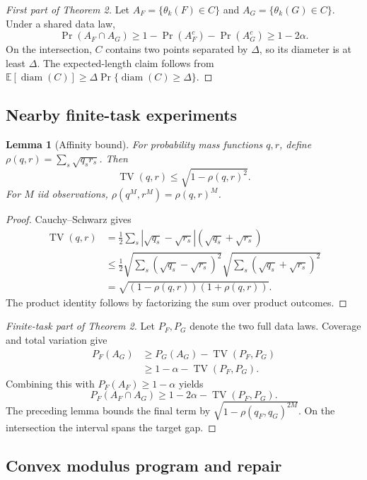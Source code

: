 \documentclass[twoside]{article}
\newtheorem{lemma}{Lemma}
\newcommand{\E}{\mathbb E}
\newcommand{\TV}{\operatorname{TV}}
\newcommand{\diam}{\operatorname{diam}}
\begin{document}
\begin{proof}[First part of Theorem 2]
Let \(A_F=\{\theta_k(F)\in C\}\) and
\(A_G=\{\theta_k(G)\in C\}\). Under a shared data law,
\[
 \Pr(A_F\cap A_G)
 \geq1-\Pr(A_F^c)-\Pr(A_G^c)\geq1-2\alpha.
\]
On the intersection, \(C\) contains two points separated by \(\Delta\), so
its diameter is at least \(\Delta\). The expected-length claim follows from
\(\E[\diam(C)]\geq\Delta\Pr\{\diam(C)\geq\Delta\}\).
\end{proof}

\subsection{Nearby finite-task experiments}

\begin{lemma}[Affinity bound]
For probability mass functions \(q,r\), define
\(\rho(q,r)=\sum_s\sqrt{q_sr_s}\). Then
\[
 \TV(q,r)\leq\sqrt{1-\rho(q,r)^2}.
\]
For \(M\) iid observations,
\(\rho(q^M,r^M)=\rho(q,r)^M\).
\end{lemma}

\begin{proof}
Cauchy--Schwarz gives
\begin{align*}
\TV(q,r)
&=\frac12\sum_s|\sqrt{q_s}-\sqrt{r_s}|
                    (\sqrt{q_s}+\sqrt{r_s})\\
&\leq\frac12
\sqrt{\sum_s(\sqrt{q_s}-\sqrt{r_s})^2}
\sqrt{\sum_s(\sqrt{q_s}+\sqrt{r_s})^2}\\
&=\sqrt{(1-\rho(q,r))(1+\rho(q,r))}.
\end{align*}
The product identity follows by factorizing the sum over product outcomes.
\end{proof}

\begin{proof}[Finite-task part of Theorem 2]
Let \(P_F,P_G\) denote the two full data laws. Coverage and total variation
give
\begin{align*}
 P_F(A_G)
 &\geq P_G(A_G)-\TV(P_F,P_G)\\
 &\geq1-\alpha-\TV(P_F,P_G).
\end{align*}
Combining this with \(P_F(A_F)\geq1-\alpha\) yields
\[
 P_F(A_F\cap A_G)\geq1-2\alpha-\TV(P_F,P_G).
\]
The preceding lemma bounds the final term by
\(\sqrt{1-\rho(q_F,q_G)^{2M}}\). On the intersection the interval spans the
target gap.
\end{proof}

\subsection{Convex modulus program and repair}
\end{document}
